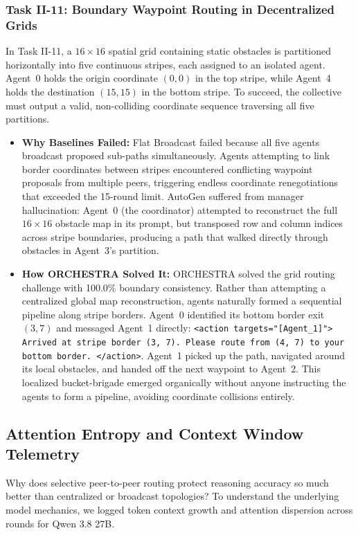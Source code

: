 \documentclass{ieeeaccess}
\begin{document}
\subsubsection{Task II-11: Boundary Waypoint Routing in Decentralized Grids}
In Task II-11, a $16 \times 16$ spatial grid containing static obstacles is partitioned horizontally into five continuous stripes, each assigned to an isolated agent. Agent~0 holds the origin coordinate $(0, 0)$ in the top stripe, while Agent~4 holds the destination $(15, 15)$ in the bottom stripe. To succeed, the collective must output a valid, non-colliding coordinate sequence traversing all five partitions.
\begin{itemize}
    \item \textbf{Why Baselines Failed:} Flat Broadcast failed because all five agents broadcast proposed sub-paths simultaneously. Agents attempting to link border coordinates between stripes encountered conflicting waypoint proposals from multiple peers, triggering endless coordinate renegotiations that exceeded the 15-round limit. AutoGen suffered from manager hallucination: Agent~0 (the coordinator) attempted to reconstruct the full $16 \times 16$ obstacle map in its prompt, but transposed row and column indices across stripe boundaries, producing a path that walked directly through obstacles in Agent~3's partition.
    \item \textbf{How ORCHESTRA Solved It:} ORCHESTRA solved the grid routing challenge with 100.0\% boundary consistency. Rather than attempting a centralized global map reconstruction, agents naturally formed a sequential pipeline along stripe borders. Agent~0 identified its bottom border exit $(3, 7)$ and messaged Agent~1 directly: \texttt{\small <action targets="[Agent\_1]"> Arrived at stripe border (3, 7). Please route from (4, 7) to your bottom border. </action>}. Agent~1 picked up the path, navigated around its local obstacles, and handed off the next waypoint to Agent~2. This localized bucket-brigade emerged organically without anyone instructing the agents to form a pipeline, avoiding coordinate collisions entirely.
\end{itemize}

\subsection{Attention Entropy and Context Window Telemetry}
Why does selective peer-to-peer routing protect reasoning accuracy so much better than centralized or broadcast topologies? To understand the underlying model mechanics, we logged token context growth and attention dispersion across rounds for Qwen 3.8 27B.
\end{document}
